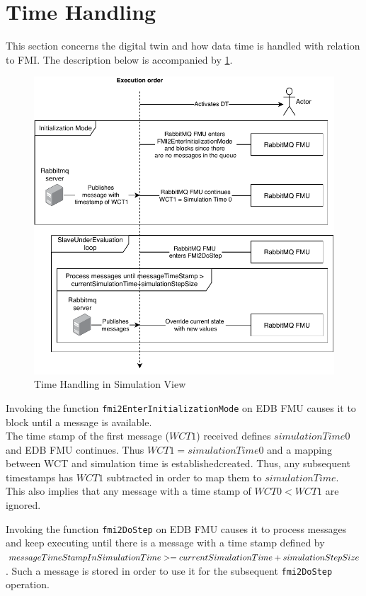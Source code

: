 \section{Time Handling}\label{sec:time_handling}
This section concerns the digital twin and how data time is handled with
relation to FMI.
The description below is accompanied by \cref{fig:time-handling_simulation-view}.

\begin{figure}[!htb]
  \centering
  \includegraphics[width=\textwidth]{figures/timehandling.pdf}
  \caption{Time Handling in Simulation View}
  \label{fig:time-handling_simulation-view}
\end{figure}

Invoking the function \texttt{fmi2EnterInitializationMode} on EDB FMU causes it to
block until a message is available.\\
The time stamp of the first message ($WCT1$) received defines $simulationTime0$ and EDB
FMU continues. Thus $WCT1 = simulationTime0$ and a mapping between WCT and simulation time is
establishedcreated. Thus, any subsequent timestamps has $WCT1$ subtracted in order to map
them to $simulationTime$.\\
This also implies that any message with a time stamp of $WCT 0 < WCT1$ are ignored.

Invoking the function \texttt{fmi2DoStep} on EDB FMU causes it to process
messages and keep executing until there is a message with a time stamp defined by
$message\-TimeStamp\-InSimulationTime >= currentSimulationTime +
simulationStepSize$. Such a message is stored in order to use it for the
subsequent \texttt{fmi2DoStep} operation.

